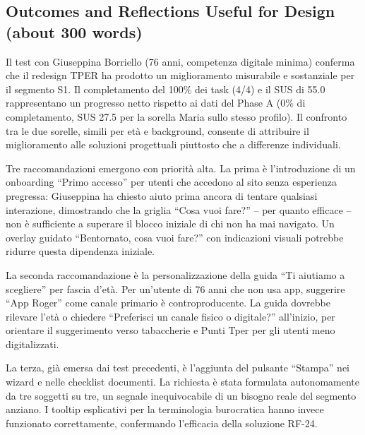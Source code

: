 \documentclass[11pt,a4paper]{article}
\begin{document}
\begin{tcolorbox}[colback=backgroundColor,colframe=primaryColor,arc=2mm]
\vspace{0.3cm}
\subsection*{Outcomes and Reflections Useful for Design (about 300 words)}

\noindent Il test con Giuseppina Borriello (76 anni, competenza digitale minima) conferma che il redesign TPER ha prodotto un miglioramento misurabile e sostanziale per il segmento S1. Il completamento del 100\% dei task (4/4) e il SUS di 55.0 rappresentano un progresso netto rispetto ai dati del Phase A (0\% di completamento, SUS 27.5 per la sorella Maria sullo stesso profilo). Il confronto tra le due sorelle, simili per et\`a e background, consente di attribuire il miglioramento alle soluzioni progettuali piuttosto che a differenze individuali.

\vspace{0.2cm}
\noindent Tre raccomandazioni emergono con priorit\`a alta. La prima \`e l'introduzione di un onboarding ``Primo accesso'' per utenti che accedono al sito senza esperienza pregressa: Giuseppina ha chiesto aiuto prima ancora di tentare qualsiasi interazione, dimostrando che la griglia ``Cosa vuoi fare?'' -- per quanto efficace -- non \`e sufficiente a superare il blocco iniziale di chi non ha mai navigato. Un overlay guidato ``Bentornato, cosa vuoi fare?'' con indicazioni visuali potrebbe ridurre questa dipendenza iniziale.

\vspace{0.2cm}
\noindent La seconda raccomandazione \`e la personalizzazione della guida ``Ti aiutiamo a scegliere'' per fascia d'et\`a. Per un'utente di 76 anni che non usa app, suggerire ``App Roger'' come canale primario \`e controproducente. La guida dovrebbe rilevare l'et\`a o chiedere ``Preferisci un canale fisico o digitale?'' all'inizio, per orientare il suggerimento verso tabaccherie e Punti Tper per gli utenti meno digitalizzati.

\vspace{0.2cm}
\noindent La terza, gi\`a emersa dai test precedenti, \`e l'aggiunta del pulsante ``Stampa'' nei wizard e nelle checklist documenti. La richiesta \`e stata formulata autonomamente da tre soggetti su tre, un segnale inequivocabile di un bisogno reale del segmento anziano. I tooltip esplicativi per la terminologia burocratica hanno invece funzionato correttamente, confermando l'efficacia della soluzione RF-24.

\vspace{0.3cm}

\end{tcolorbox}
\end{document}
